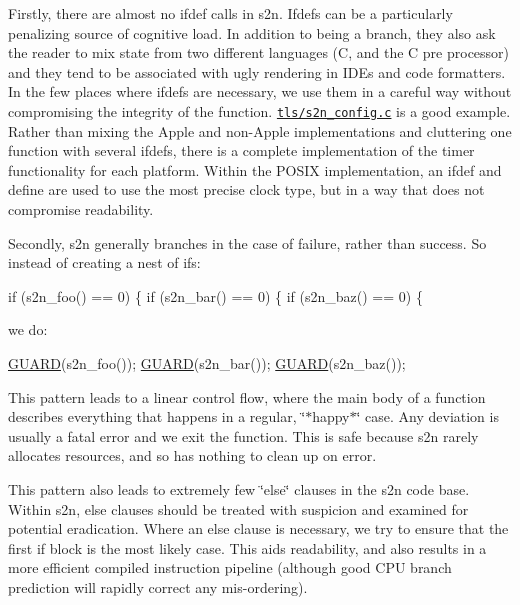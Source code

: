Firstly, there are almost no ifdef calls in s2n. Ifdefs can be a particularly penalizing source of cognitive load. In addition to being a branch, they also ask the reader to mix state from two different languages (C, and the C pre processor) and they tend to be associated with ugly rendering in I\+D\+Es and code formatters. In the few places where ifdef\textquotesingle{}s are necessary, we use them in a careful way without compromising the integrity of the function. \href{https://github.com/awslabs/s2n/blob/master/tls/s2n_config.c}{\tt tls/s2n\+\_\+config.\+c} is a good example. Rather than mixing the Apple and non-\/\+Apple implementations and cluttering one function with several ifdefs, there is a complete implementation of the timer functionality for each platform. Within the P\+O\+S\+IX implementation, an ifdef and define are used to use the most precise clock type, but in a way that does not compromise readability.

Secondly, s2n generally branches in the case of failure, rather than success. So instead of creating a nest of if\textquotesingle{}s\+:


\begin{DoxyCode}
\textcolor{keywordflow}{if} (s2n\_foo() == 0) \{
    \textcolor{keywordflow}{if} (s2n\_bar() == 0) \{
         \textcolor{keywordflow}{if} (s2n\_baz() == 0) \{
\end{DoxyCode}


we do\+:


\begin{DoxyCode}
\hyperlink{s2n__safety_8h_ad400572229cc8e40f7996837deb680f3}{GUARD}(s2n\_foo());
\hyperlink{s2n__safety_8h_ad400572229cc8e40f7996837deb680f3}{GUARD}(s2n\_bar());
\hyperlink{s2n__safety_8h_ad400572229cc8e40f7996837deb680f3}{GUARD}(s2n\_baz());
\end{DoxyCode}


This pattern leads to a linear control flow, where the main body of a function describes everything that happens in a regular, \char`\"{}$\ast$happy$\ast$\char`\"{} case. Any deviation is usually a fatal error and we exit the function. This is safe because s2n rarely allocates resources, and so has nothing to clean up on error.

This pattern also leads to extremely few \char`\"{}else\char`\"{} clauses in the s2n code base. Within s2n, else clauses should be treated with suspicion and examined for potential eradication. Where an else clause is necessary, we try to ensure that the first if block is the most likely case. This aids readability, and also results in a more efficient compiled instruction pipeline (although good C\+PU branch prediction will rapidly correct any mis-\/ordering).

